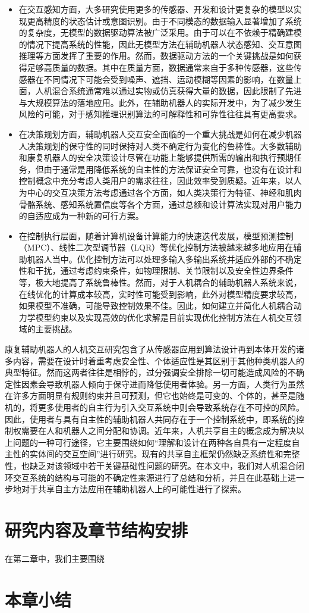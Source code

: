 \begin{itemize}
\item 在交互感知方面，大多研究使用更多的传感器、开发和设计更复杂的模型以实现更高精度的状态估计或意图识别。由于不同模态的数据输入显著增加了系统的复杂度，无模型的数据驱动算法被广泛采用。由于可以在不依赖于精确建模的情况下提高系统的性能，因此无模型方法在辅助机器人状态感知、交互意图推理等方面发挥了重要的作用。然而，数据驱动方法的一个关键挑战是如何获得足够高质量的数据。其中在质量方面，数据通常来自于多种传感器，这些传感器在不同情况下可能会受到噪声、遮挡、运动模糊等因素的影响，在数量上面，人机混合系统通常难以通过实物或仿真获得大量的数据，因此限制了先进与大规模算法的落地应用。此外，在辅助机器人的实际开发中，为了减少发生风险的可能，对于感知推理识别算法的可解释性和可靠性往往具有更高要求。

\item 在决策规划方面，辅助机器人交互安全面临的一个重大挑战是如何在减少机器人决策规划的保守性的同时保持对人类不确定行为变化的鲁棒性。大多数辅助和康复机器人的安全决策设计尽管在功能上能够提供所需的输出和执行预期任务，但由于通常是用降低系统的自主性的方法保证安全可靠，也没有在设计和控制概念中充分考虑人类用户的需求往往，因此效率受到质疑。近年来，以人为中心的交互决策方法考虑通过各个方面，如人类决策行为特征、神经和肌肉骨骼系统、感知系统置信度等各个方面，通过总额和设计算法实现对用户能力的自适应成为一种新的可行方案。

\item 在控制执行层面，随着计算机设备计算能力的快速迭代发展，模型预测控制（MPC）、线性二次型调节器（LQR）等优化控制方法被越来越多地应用在辅助机器人当中。优化控制方法可以处理多输入多输出系统并适应外部的不确定性和干扰，通过考虑约束条件，如物理限制、关节限制以及安全性边界条件等，极大地提高了系统鲁棒性。然而，对于人机耦合的辅助机器人系统来说，在线优化的计算成本较高，实时性可能受到影响，此外对模型精度要求较高，如果模型不准确，可能导致控制效果不佳。因此，如何建立并简化人机耦合动力学模型约束以及实现高效的优化求解是目前实现优化控制方法在人机交互领域的主要挑战。
\end{itemize}

康复辅助机器人的人机交互研究包含了从传感器应用到算法设计再到本体开发的诸多内容，需要在设计时着重考虑安全性、个体适应性是其区别于其他种类机器人的典型特征。然而这两者往往是相悖的，过分强调安全排除一切可能造成风险的不确定性因素会导致机器人倾向于保守进而降低使用者体验。另一方面，人类行为虽然在许多方面明显有规则约束并且可预测，但它也始终是可变的、个体的，甚至是随机的，将更多使用者的自主行为引入交互系统中则会导致系统存在不可控的风险。因此，使用者与具有自主性的辅助机器人共同存在于一个控制系统中，即系统的控制权需要在人和机器人之间分配和协调\cite{ZhaoQianTanKongZhiZhongDeGongXiangXinXiHeGongXiangZiZhu2021}。近年来，人机共享自主的概念成为解决以上问题的一种可行途径，它主要围绕如何``理解和设计在两种各自具有一定程度自主性的实体间的交互空间''进行研究\cite{abbassTrustedAutonomyCognitive2016}。现有的共享自主框架仍然缺乏系统性和完整性，也缺乏对该领域中若干关键基础性问题的研究。在本文中，我们对人机混合闭环交互系统的结构与可能的不确定性来源进行了总结和分析，并且在此基础上进一步地对于共享自主方法应用在辅助机器人上的可能性进行了探索。

\section{研究内容及章节结构安排}

在第二章中，我们主要围绕

\section{本章小结}
